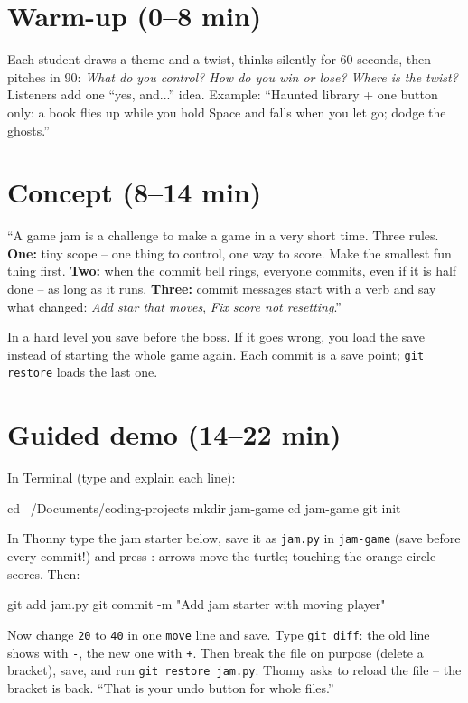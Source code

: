 \section{Warm-up (0--8 min)}
\begin{unplugged}
Each student draws a theme and a twist, thinks silently for 60 seconds, then pitches in 90: \emph{What do you control? How do you win or lose? Where is the twist?} Listeners add one \enquote{yes, and...} idea. Example: \enquote{Haunted library + one button only: a book flies up while you hold Space and falls when you let go; dodge the ghosts.}
\end{unplugged}

\section{Concept (8--14 min)}
\begin{teacherscript}[Say]
\enquote{A game jam is a challenge to make a game in a very short time. Three rules. \textbf{One:} tiny scope -- one thing to control, one way to score. Make the smallest fun thing first. \textbf{Two:} when the commit bell rings, everyone commits, even if it is half done -- as long as it runs. \textbf{Three:} commit messages start with a verb and say what changed: \emph{Add star that moves}, \emph{Fix score not resetting}.}
\end{teacherscript}

\begin{analogy}
In a hard level you save before the boss. If it goes wrong, you load the save instead of starting the whole game again. Each commit is a save point; \texttt{git restore} loads the last one.
\end{analogy}

\section{Guided demo (14--22 min)}
\begin{workedexample}
In Terminal (type and explain each line):
\begin{shellcode}
cd ~/Documents/coding-projects
mkdir jam-game
cd jam-game
git init
\end{shellcode}
In Thonny type the jam starter below, save it as \texttt{jam.py} in \texttt{jam-game} (save before every commit!) and press : arrows move the turtle; touching the orange circle scores. Then:
\begin{shellcode}
git add jam.py
git commit -m "Add jam starter with moving player"
\end{shellcode}
Now change \texttt{20} to \texttt{40} in one \texttt{move} line and save. Type \texttt{git diff}: the old line shows with \texttt{-}, the new one with \texttt{+}. Then break the file on purpose (delete a bracket), save, and run \texttt{git restore jam.py}: Thonny asks to reload the file -- the bracket is back. \enquote{That is your undo button for whole files.}
\end{workedexample}

